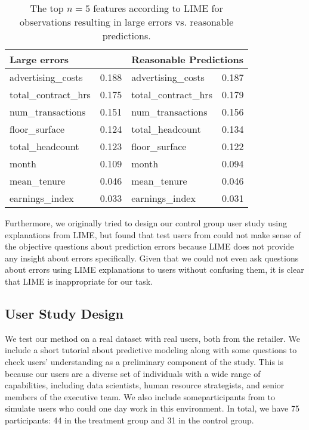 \begin{table}[]
\caption{The top $n=5$ features according to LIME for observations resulting in large errors vs. reasonable predictions.}
\label{table:lime}
\centering
\begin{tabular}{llll}
\toprule
\multicolumn{2}{l}{\textbf{Large errors}} & \multicolumn{2}{l}{\textbf{Reasonable Predictions}} \\
\midrule
advertising\_costs             & 0.188      & advertising\_costs                 & 0.187        \\
total\_contract\_hrs                 & 0.175      & total\_contract\_hrs                    & 0.179        \\
num\_transactions            & 0.151      & num\_transactions               & 0.156        \\
floor\_surface                & 0.124      & total\_headcount                & 0.134        \\
total\_headcount             & 0.123      & floor\_surface                      & 0.122        \\
month                     & 0.109      & month                          & 0.094        \\
mean\_tenure      & 0.046      & mean\_tenure         & 0.046        \\
earnings\_index                & 0.033      & earnings\_index                   & 0.031        \\
\bottomrule
\end{tabular}
\end{table}


Furthermore, we originally tried to design our control group user study using explanations from LIME, but found that test users from \OurCompany{} could not make sense of the objective questions about prediction errors because LIME does not provide any insight about errors specifically. 
Given that we could not even ask questions about errors using LIME explanations to users without confusing them, it is clear that LIME is inappropriate for our task. 

\subsection{User Study Design}
\label{section:studydesign}
We test our method on a real dataset with real users, both from the retailer. 
We include a short tutorial about predictive modeling along with some questions to check users' understanding as a preliminary component of the study. 
This is because our users are a diverse set of individuals with a wide range of capabilities, including data scientists, human resource strategists, and senior members of the executive team. 
We also include  some\fi participants from \OurUniversity{} to simulate users who could one day work in this environment. 
In total, we have 75 participants: 44 in the treatment group and 31 in the control group. 


